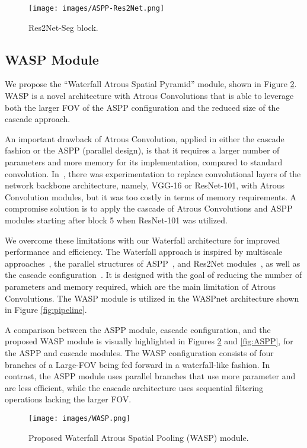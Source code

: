 \documentclass[sensors,article,accept,moreauthors,pdftex]{Definitions/mdpi}
\begin{document}
\begin{figure}[H]
\centering
\texttt{[image: images/ASPP-Res2Net.png]}
\caption{Res2Net-Seg block.}
\label{fig:Res2Net}
\end{figure}

\subsection{WASP Module}
We propose the ``Waterfall Atrous Spatial Pyramid'' module, shown in Figure \ref{fig:WASP}.
WASP is a novel architecture with Atrous Convolutions that is able to leverage both the larger FOV of the ASPP configuration and the reduced size of the cascade approach.

An important drawback of Atrous Convolution, applied in either the cascade fashion or the ASPP (parallel design), is that it requires a larger number of parameters and more memory for its implementation, compared to standard convolution.
In~\cite{DeepLab}, there was experimentation to replace convolutional layers of the network backbone architecture, namely, VGG-16 or ResNet-101, with Atrous Convolution modules, but it was too costly in terms of memory requirements. A compromise solution is to apply the cascade of Atrous Convolutions and ASPP modules starting after block 5 when ResNet-101 was utilized.

We overcome these limitations with our Waterfall architecture for improved performance and efficiency.
The Waterfall approach is inspired by multiscale approaches~\cite{Multi-scale-Eigen,Multi-scale-Roy}, the parallel structures of ASPP~\cite{DeepLab}, and Res2Net modules~\cite{Res2Net}, as well as the cascade configuration~\cite{Rethinking}. It is designed with the goal of reducing the number of parameters and memory required, which are the main limitation of Atrous Convolutions.
The WASP module is utilized in the WASPnet architecture shown in Figure \ref{fig:pipeline}.

A comparison between the ASPP module, cascade configuration, and the proposed WASP module is visually highlighted in Figures \ref{fig:WASP} and \ref{fig:ASPP}, for the ASPP and cascade modules.
The WASP configuration consists of four branches of a Large-FOV being fed forward in a waterfall-like fashion. In contrast, the ASPP module uses parallel branches that use more parameter and are less efficient, while the cascade architecture uses sequential filtering operations lacking the larger FOV.


\begin{figure}[H]
\centering
\texttt{[image: images/WASP.png]}
\caption{Proposed Waterfall Atrous Spatial Pooling (WASP) module.}
\label{fig:WASP}
\end{figure}
\unskip
\end{document}
